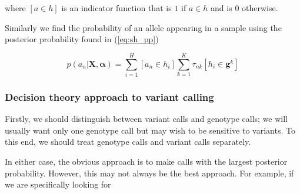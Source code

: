 \documentclass{article}
\begin{document}
where $[a \in h]$ is an indicator function that is $1$ if $a \in h$ and is $0$ otherwise.

Similarly we find the probability of an allele appearing in a sample using the posterior probability found in (\ref{eq:sh_pp})

\begin{equation}
\label{eq:sa_pp}
    p(a_n | \boldsymbol{X}, \boldsymbol{\alpha}) = \sum_{i = 1}^H [a_n \in h_i] \sum_{k = 1}^K \tau_{nk} [h_i \in \boldsymbol{g}^k]
\end{equation}

\subsubsection{Decision theory approach to variant calling}

Firstly, we should distinguish between variant calls and genotype calls; we will usually want only one genotype call but may wish to be sensitive to variants. To this end, we should treat genotype calls and variant calls separately.

In either case, the obvious approach is to make calls with the largest posterior probability. However, this may not always be the best approach. For example, if we are specifically looking for 
\end{document}
